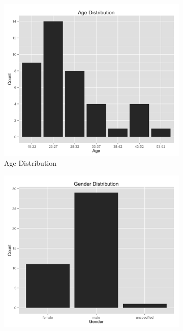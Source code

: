 \documentclass{article}
\begin{document}
\begin{figure}[H]
\centering
\begin{subfigure}{.5\textwidth}
    \centering
    \includegraphics[width=1.0\linewidth]{graphs/age.png}
    \caption{Age Distribution}
    \label{agedistribution}
\end{subfigure}%
\begin{subfigure}{.5\textwidth}
    \centering
    \includegraphics[width=1.0\linewidth]{graphs/gender.png}

\end{subfigure}
\end{figure}
\end{document}
